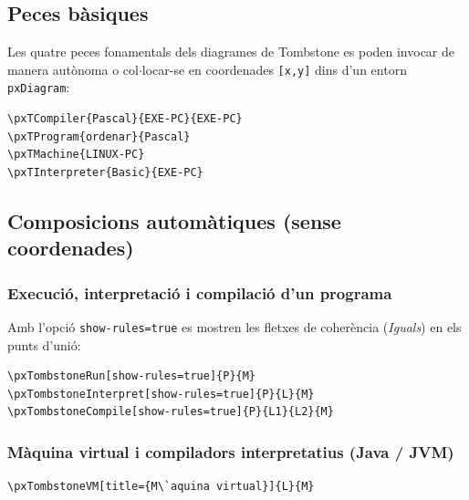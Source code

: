 \documentclass[11pt,a4paper]{article}
\begin{document}
\subsection{Peces b\`asiques}
Les quatre peces fonamentals dels diagrames de Tombstone es poden invocar de manera
aut\`onoma o col$\cdot$locar-se en coordenades \texttt{[x,y]} dins d'un entorn \texttt{pxDiagram}:

\begin{verbatim}
\pxTCompiler{Pascal}{EXE-PC}{EXE-PC}
\pxTProgram{ordenar}{Pascal}
\pxTMachine{LINUX-PC}
\pxTInterpreter{Basic}{EXE-PC}
\end{verbatim}

\quad
{}\quad
{}\quad
{}

\subsection{Composicions autom\`atiques (sense coordenades)}

\subsubsection*{Execuci\'o, interpretaci\'o i compilaci\'o d'un programa}
Amb l'opci\'o \texttt{show-rules=true} es mostren les fletxes de coher\`encia (\emph{Iguals})
en els punts d'uni\'o:

\begin{verbatim}
\pxTombstoneRun[show-rules=true]{P}{M}
\pxTombstoneInterpret[show-rules=true]{P}{L}{M}
\pxTombstoneCompile[show-rules=true]{P}{L1}{L2}{M}
\end{verbatim}


\subsubsection*{M\`aquina virtual i compiladors interpretatius (Java / JVM)}
\begin{verbatim}
\pxTombstoneVM[title={M\`aquina virtual}]{L}{M}
\end{verbatim}
\end{document}
